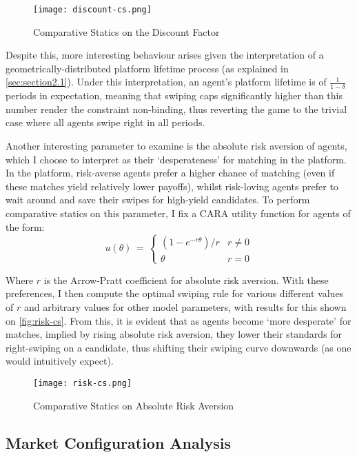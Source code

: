 \begin{figure}[h] 
    \centering
    \caption{Comparative Statics on the Discount Factor}
    \texttt{[image: discount-cs.png]}
    \label{fig:discount-cs}
\end{figure}

Despite this, more interesting behaviour arises given the interpretation of a geometrically-distributed platform lifetime process (as explained in \autoref{sec:section2.1}). Under this interpretation, an agent's platform lifetime is of $\frac{1}{1-\delta}$ periods in expectation, meaning that swiping caps significantly higher than this number render the constraint non-binding, thus reverting the game to the trivial case where all agents swipe right in all periods.

Another interesting parameter to examine is the absolute risk aversion of agents, which I choose to interpret as their `desperateness' for matching in the platform. In the platform, risk-averse agents prefer a higher chance of matching (even if these matches yield relatively lower payoffs), whilst risk-loving agents prefer to wait around and save their swipes for high-yield candidates. To perform comparative statics on this parameter, I fix a CARA utility function for agents of the form:
\begin{equation*}
    u(\theta) \,=\, \begin{cases} \left(1-e^{-r\theta}\right)/r & r\neq0 \\ \theta & r=0\end{cases}
\end{equation*}

Where $r$ is the Arrow-Pratt coefficient for absolute risk aversion. With these preferences, I then compute the optimal swiping rule for various different values of $r$ and arbitrary values for other model parameters, with results for this shown on \autoref{fig:risk-cs}. From this, it is evident that as agents become `more desperate' for matches, implied by rising absolute risk aversion, they lower their standards for right-swiping on a candidate, thus shifting their swiping curve downwards (as one would intuitively expect).

\begin{figure}[ht]
    \centering
    \caption{Comparative Statics on Absolute Risk Aversion}
    \texttt{[image: risk-cs.png]}
    \label{fig:risk-cs} 
\end{figure}

\subsection{Market Configuration Analysis}\label{sec:section3.3} 


\begin{comment}
\begin{itemize}
    \item Present CS on individual factors and explain intuitively
    \item These include: patience, risk aversion, distributions  
    \item Present case of gender imbalance... why is it that men always swipe right?
    \item 
\end{itemize} 
\end{comment}